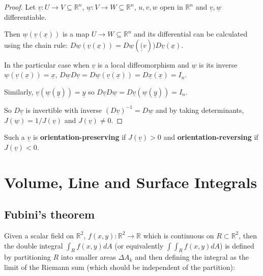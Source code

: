 \begin{proof}
	Let $\underline{v}: U \rightarrow V \subseteq \mathbb{R}^n$, $\underline{w}: V \rightarrow W \subseteq \mathbb{R}^n$, $u, v, w$ open in $\mathbb{R}^n$ and $\underline{v}, \underline{w}$ differentiable.

	Then $\underline{w}(\underline{v}(\underline{x}))$ is a map $U \rightarrow W \subseteq \mathbb{R}^n$ and its differential can be calculated using the chain rule: $D \underline{w}(\underline{v}(\underline{x})) = D \underline{w}(\underline(v)) D \underline{v}(\underline{x})$.

	In the particular case when $\underline{v}$ is a local diffeomorphism and $\underline{w}$ is its inverse $\underline{w}(\underline{v}(\underline{x})) = \underline{x}$, $D \underline{w} D \underline{v} = D \underline{w}(\underline{v}(\underline{x})) = D \underline{x}(\underline{x}) = I_n$.

	Similarly, $\underline{v}(\underline{w}(\underline{y})) = \underline{y}$ so $D \underline{v} D \underline{w} = D \underline{v}(\underline{w}(\underline{y})) = I_n$.

	So $D \underline{v}$ is invertible with inverse ${(D \underline{v})}^{-1} = D \underline{w}$ and by taking determinants, $J(\underline{w}) = 1 / J(\underline{v})$ and $J(\underline{v}) \ne 0$.
\end{proof}

\begin{definition}
	Such a $\underline{v}$ is \textbf{orientation-preserving} if $J(\underline{v}) > 0$ and \textbf{orientation-reversing} if $J(\underline{v}) < 0$.
\end{definition}

\section{Volume, Line and Surface Integrals}

\subsection{Fubini's theorem}

Given a scalar field on $\mathbb{R}^2$, $f(x, y): \mathbb{R}^2 \rightarrow \mathbb{R}$ which is continuous on $R \subset \mathbb{R}^2$, then the double integral $\int_R f(x, y) dA$ (or equivalently $\int \int_R f(x, y) dA$) is defined by partitioning $R$ into smaller areas $\Delta A_k$ and then defining the integral as the limit of the Riemann sum (which should be independent of the partition):

